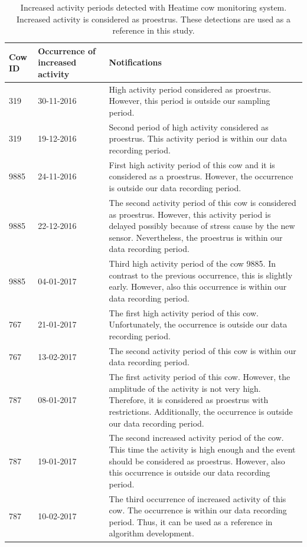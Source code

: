\documentclass[english,12pt,a4paper,pdftex,elec,utf8]{aaltothesis}
\begin{document}
\begin{table} \caption{Increased activity periods detected with Heatime cow monitoring system. Increased activity is considered as proestrus. These detections are used as a reference in this study.} \label{fullestrustable}
\centering
\begin{tabular}{| p{1.25cm} | p{2.25cm} | p{9 cm} |}
\hline
\textbf{Cow ID} & \textbf{Occurrence of increased activity} & \textbf{Notifications} \\  \hline
319 & 30-11-2016 & High activity period considered as proestrus. However, this period is outside our sampling period. \\ \hline
319 & 19-12-2016 &  Second period of high activity considered as proestrus. This activity period is within our data recording period.  \\ \hline
9885 & 24-11-2016 & First high activity period of this cow and it is considered as a proestrus. However, the occurrence is outside our data recording period.  \\ \hline
9885  & 22-12-2016  & The second activity period of this cow is considered as proestrus. However, this activity period is delayed possibly because of stress cause by the new sensor. Nevertheless, the proestrus is within our data recording period.  \\ \hline
9885  & 04-01-2017  & Third high activity period of the cow 9885. In contrast to the previous occurrence, this is slightly early. However, also this occurrence is within our data recording period.  \\ \hline
 767 &  21-01-2017 & The first high activity period of this cow. Unfortunately, the occurrence is outside our data recording period.  \\ \hline
 767 & 13-02-2017  & The second activity period of this cow is within our data recording period.  \\ \hline
 787 & 08-01-2017 &  The first activity period of this cow. However, the amplitude of the activity is not very high. Therefore, it is considered as proestrus with restrictions. Additionally, the occurrence is outside our data recording period. \\ \hline
 787 & 19-01-2017  & The second increased activity period of the cow. This time the activity is high enough and the event should be considered as proestrus. However, also this occurrence is outside our data recording period.  \\ \hline
 787 & 10-02-2017  &  The third occurrence of increased activity of this cow. The occurrence is within our data recording period. Thus, it can be used as a reference in algorithm development. \\ \hline
\end{tabular}
\end{table}
\end{document}
